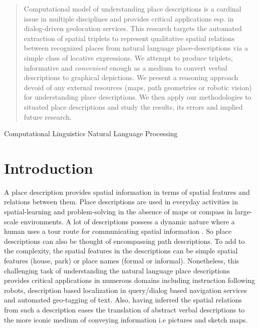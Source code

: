 \documentclass{acm_proc_article-sp}
\begin{document}
\maketitle
\begin{abstract}
Computational model of understanding place descriptions is a cardinal issue in multiple disciplines and provides critical applications esp. in dialog-driven geolocation services. This research targets the automated extraction of spatial triplets to represent qualitative spatial relations between recognized places from 
natural language place-descriptions via a simple class of locative expressions. We attempt to produce triplets, informative and \textit{convenient} enough as a medium to convert verbal descriptions to graphical depictions. We present a reasoning approach devoid of any external resources (maps, path geometries or robotic vision) for understanding place descriptions. We then apply our methodologies to situated place descriptions and study the results, its errors and implied future research.
\end{abstract}

Computational Linguistics
Natural Language Processing



\section{Introduction}
A place description provides spatial information in terms of spatial features and relations between them. Place descriptions are used in everyday activities in spatial-learning and problem-solving in the absence of maps or compass in large-scale environments. A lot of descriptions possess a dynamic nature where a human uses a tour route for communicating spatial information \cite{linde:spatial}. So place descriptions can also be thought of encompassing path descriptions. To add to the complexity, the spatial features in the descriptions can be simple spatial features (house, park) or place names (formal or informal). Nonetheless, this challenging task of understanding the natural language place descriptions provides critical applications in numerous domains including instruction following robots, description based localization in query/dialog based navigation services and automated geo-tagging of text. Also, having inferred the spatial relations from such a description eases the translation of abstract verbal descriptions to the more iconic medium of conveying information i.e pictures and sketch maps. 
\end{document}
